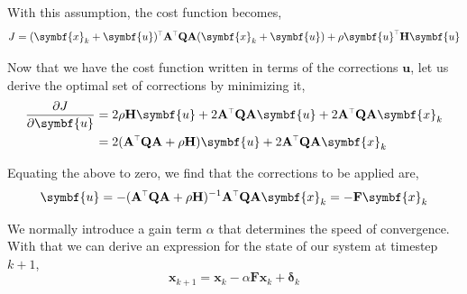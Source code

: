\documentclass[SE,authoryear,toc]{lsstdoc}
\renewcommand{\v}[1]{\mathbf{#1}}
\newcommand{\tr}{\scalebox{0.6}{$\top$}}
\begin{document}
With this assumption, the cost function becomes, 
\begin{equation}
     J = (\symbf{x}_{k} + \symbf{u})^{\tr}\v{A}^{\tr}\v{Q}\v{A}(\symbf{x}_{k} + \symbf{u}) + \rho \symbf{u}^{\tr}\v{H}\symbf{u}
\end{equation}

Now that we have the cost function written in terms of the corrections $\symbf{u}$, let us derive the optimal set of corrections by minimizing it, 
\begin{equation}
\begin{split}
    \frac{\partial J}{\partial \symbf{u}} & = 2\rho \v{H} \symbf{u} + 2 \v{A}^{\tr}\v{Q}\v{A} \symbf{u} + 2\v{A}^{\tr}\v{Q}\v{A} \symbf{x}_k \\
    & = 2( \v{A}^{\tr}\v{Q}\v{A} + \rho \v{H})\symbf{u} + 2 \v{A}^{\tr}\v{Q}\v{A} \symbf{x}_k
\end{split}
\end{equation}

Equating the above to zero, we find that the corrections to be applied are, 
\begin{equation}
    \symbf{u} = -(\v{A}^{\tr}\v{Q}\v{A} + \rho \v{H})^{-1}\v{A}^{\tr}\v{Q}\v{A}\symbf{x}_k = -\v{F}\symbf{x}_k
\end{equation}

We normally introduce a gain term $\alpha$ that determines the speed of convergence. With that we can derive an expression for the state of our system at timestep $k+1$,
\begin{equation}\label{eq4}
    \symbf{x}_{k + 1} = \symbf{x}_{k} - \alpha\v{F}\symbf{x}_k + \symbf{\delta}_{k}
\end{equation}
\end{document}
